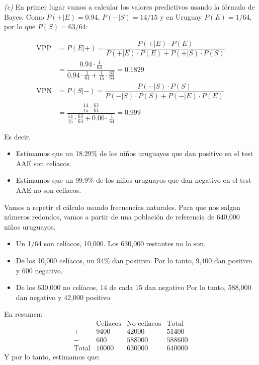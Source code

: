 \documentclass[
]{book}
\providecommand{\tightlist}{%
  \setlength{\itemsep}{0pt}\setlength{\parskip}{0pt}}
\theoremstyle{definition}
\theoremstyle{definition}
\theoremstyle{definition}
\theoremstyle{definition}
\theoremstyle{remark}
\begin{document}
\emph{(c)} En primer lugar vamos a calcular los valores predictivos usando la fórmula de Bayes. Como \(P(+|E)=0.94\), \(P(-|S)=14/15\) y en Uruguay \(P(E)=1/64\), por lo que \(P(S)=63/64\):

\[
\begin{array}{rl}
\text{VPP}\!\!\!\! & =P(E|+)=\dfrac{P(+|E)\cdot P(E)}{P(+|E)\cdot P(E)+P(+|S)\cdot P(S)}\\
&= \dfrac{0.94\cdot \frac{1}{64}}{0.94\cdot \frac{1}{64}+\frac{1}{15}\cdot \frac{63}{64}}=0.1829\\[1ex]
\text{VPN} \!\!\!\!& =P(S|-)=\dfrac{P(-|S)\cdot P(S)}{P(-|S)\cdot P(S)+P(-|E)\cdot P(E)}\\
&= \dfrac{\frac{14}{15}\cdot \frac{63}{64}}{\frac{14}{15}\cdot \frac{63}{64}+0.06\cdot \frac{1}{64}}=0.999
\end{array}
\]

Es decir,

\begin{itemize}
\tightlist
\item
  Estimamos que un 18.29\% de los niños uruguayos que dan positivo en el test AAE son celíacos.
\item
  Estimamos que un 99.9\% de los niños uruguayos que dan negativo en el test AAE no son celíacos.
\end{itemize}

Vamos a repetir el cálculo usando frecuencias naturales. Para que nos salgan números redondos, vamos a partir de una población de referencia de 640,000 niños uruguayos.

\begin{itemize}
\tightlist
\item
  Un 1/64 son celíacos, 10,000. Los 630,000 restantes no lo son.
\item
  De los 10,000 celíacos, un 94\% dan positivo. Por lo tanto, 9,400 dan positivo y 600 negativo.
\item
  De los 630,000 no celíacos, 14 de cada 15 dan negativo Por lo tanto, 588,000 dan negativo y 42,000 positivo.
\end{itemize}

En resumen:
\[
\begin{array}{r|c|c|c}
& \text{Celíacos} & \text{No celíacos}  & \text{Total} \\ \hline
+ & 9400  &  42000 &  51400 \\ \hline
- & 600  & 588000 &  588600  \\ \hline
\text{Total} &  10000 & 630000 & 640000 
\end{array}
\]
Y por lo tanto, estimamos que:
\end{document}
